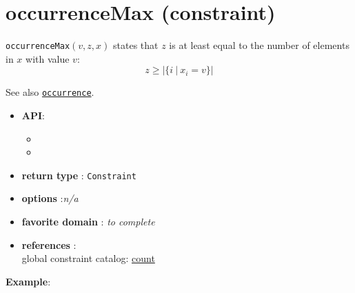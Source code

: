 \label{occurrencemax}
\hypertarget{occurrencemax}{}

\section{occurrenceMax (constraint)}\label{occurrencemax:occurrencemaxconstraint}\hypertarget{occurrencemax:occurrencemaxconstraint}{}
\begin{notedef}
  \texttt{occurrenceMax}$(v,z,x)$ states that $z$ is at least equal to the number of elements in $x$ with value $v$:
$$z\ge|\{i\ |\ x_i=v\}|$$   
\end{notedef}
  See also \hyperlink{occurrence:occurrenceconstraint}{\tt occurrence}.

\begin{itemize}
	\item \textbf{API}:
      \begin{itemize}
      \item {}
      \item {}
      \end{itemize}
	\item \textbf{return type} : \texttt{Constraint}
	\item \textbf{options} :\emph{n/a}
	\item \textbf{favorite domain} : \emph{to complete}
	\item \textbf{references} :\\
      global constraint catalog: \href{http://www.emn.fr/x-info/sdemasse/gccat/Ccount.html}{count}
\end{itemize}

\textbf{Example}:

